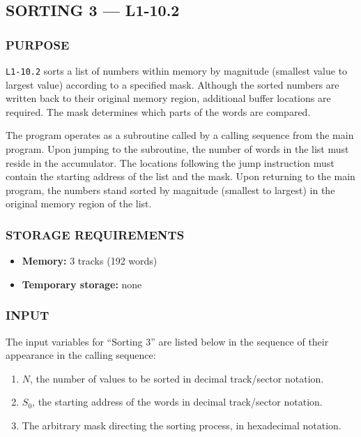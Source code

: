 \newpage

\subsection*{SORTING 3 --- L1-10.2}

\subsubsection*{PURPOSE}
\texttt{L1-10.2} sorts a list of numbers within memory by magnitude (smallest value to largest value) according to a specified mask. Although the sorted numbers are written back to their original memory region, additional buffer locations are required. The mask determines which parts of the words are compared.

The program operates as a subroutine called by a calling sequence from the main program. Upon jumping to the subroutine, the number of words in the list must reside in the accumulator. The locations following the jump instruction must contain the starting address of the list and the mask. Upon returning to the main program, the numbers stand sorted by magnitude (smallest to largest) in the original memory region of the list.

\subsubsection*{STORAGE REQUIREMENTS}
\begin{itemize}
    \item[] \textbf{Memory:} 3 tracks (192 words)
    \item[] \textbf{Temporary storage:} none
\end{itemize}

\subsubsection*{INPUT}
The input variables for ``Sorting 3'' are listed below in the sequence of their appearance in the calling sequence:
\begin{enumerate}
    \item $N$, the number of values to be sorted in decimal track/sector notation.
    \item $S_0$, the starting address of the words in decimal track/sector notation.
    \item The arbitrary mask directing the sorting process, in hexadecimal notation.
\end{enumerate}

